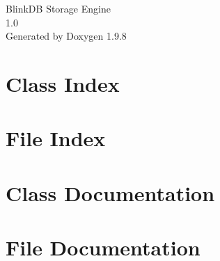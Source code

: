 \documentclass[twoside]{book}
\newcommand{\+}{\discretionary{\mbox{\scriptsize$\hookleftarrow$}}{}{}}
\newcommand{\clearemptydoublepage}{%
    \newpage{\pagestyle{empty}\cleardoublepage}%
  }
\begin{document}
  \raggedbottom
    \hypersetup{pageanchor=false,
                bookmarksnumbered=true,
                pdfencoding=unicode
               }
  \begin{titlepage}
  \vspace*{7cm}
  \begin{center}%
  {\Large Blink\+DB Storage Engine}\\
  [1ex]\large 1.\+0 \\
  \vspace*{1cm}
  {\large Generated by Doxygen 1.9.8}\\
  \end{center}
  \end{titlepage}
  \clearemptydoublepage
  \tableofcontents
  \clearemptydoublepage
  \hypersetup{pageanchor=true}
\chapter{Class Index}

\chapter{File Index}

\chapter{Class Documentation}





\chapter{File Documentation}






  \backmatter
  \newpage
  \clearemptydoublepage
  \printindex
\end{document}
